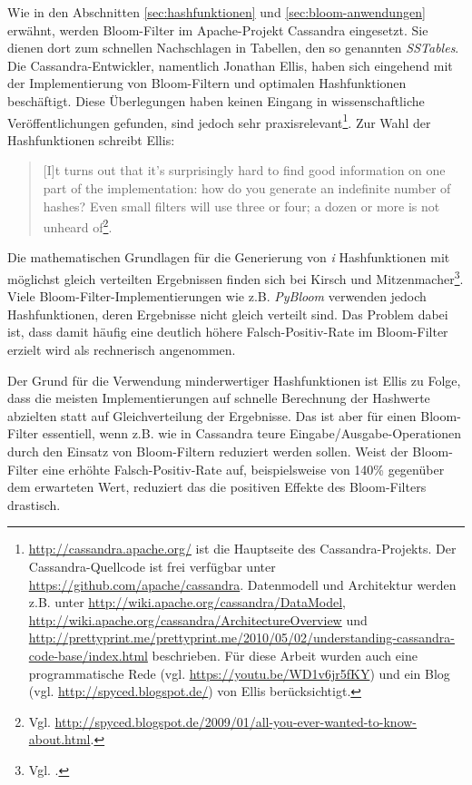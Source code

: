 Wie in den Abschnitten \ref{sec:hashfunktionen} und \ref{sec:bloom-anwendungen} erwähnt, werden Bloom-Filter im Apache-Projekt Cassandra eingesetzt. Sie dienen dort zum schnellen Nachschlagen in Tabellen, den so genannten \textit{SSTables}. Die Cassandra-Entwickler, namentlich Jonathan Ellis, haben sich eingehend mit der Implementierung von Bloom-Filtern und optimalen Hashfunktionen beschäftigt. Diese Überlegungen haben keinen Eingang in wissenschaftliche Veröffentlichungen gefunden, sind jedoch sehr praxisrelevant\footnote{\url{http://cassandra.apache.org/} ist die Hauptseite des Cassandra-Projekts. Der Cassandra-Quellcode ist frei verfügbar unter \url{https://github.com/apache/cassandra}. Datenmodell und Architektur werden z.B. unter \url{http://wiki.apache.org/cassandra/DataModel}, \url{http://wiki.apache.org/cassandra/ArchitectureOverview} und \url{http://prettyprint.me/prettyprint.me/2010/05/02/understanding-cassandra-code-base/index.html} beschrieben. Für diese Arbeit wurden auch eine programmatische Rede (vgl. \url{https://youtu.be/WD1v6jr5fKY}) und ein Blog (vgl. \url{http://spyced.blogspot.de/}) von Ellis berücksichtigt.}. Zur Wahl der Hashfunktionen schreibt Ellis: 
\begin{quote}
[I]t turns out that it's surprisingly hard to find good information on one part of the implementation: how do you generate an indefinite number of hashes? Even small filters will use three or four; a dozen or more is not unheard of\footnote{Vgl. \url{http://spyced.blogspot.de/2009/01/all-you-ever-wanted-to-know-about.html}.}. 
\end{quote}
Die mathematischen Grundlagen für die Generierung von \textit{i} Hashfunktionen mit möglichst gleich verteilten Ergebnissen finden sich bei Kirsch und Mitzenmacher\footnote{Vgl. \cite{Kirsch2006}.}. Viele Bloom-Filter-Implementierungen wie z.B. \textit{PyBloom} verwenden jedoch Hashfunktionen, deren Ergebnisse nicht gleich verteilt sind. Das Problem dabei ist, dass damit häufig eine deutlich höhere Falsch-Positiv-Rate im Bloom-Filter erzielt wird als rechnerisch angenommen. 

Der Grund für die Verwendung minderwertiger Hashfunktionen ist Ellis zu Folge, dass die meisten Implementierungen auf schnelle Berechnung der Hashwerte abzielten statt auf Gleichverteilung der Ergebnisse. Das ist aber für einen Bloom-Filter essentiell, wenn z.B. wie in Cassandra teure Eingabe/Ausgabe-Operationen durch den Einsatz von Bloom-Filtern reduziert werden sollen. Weist der Bloom-Filter eine erhöhte Falsch-Positiv-Rate auf, beispielsweise von 140\% gegenüber dem erwarteten Wert, reduziert das die positiven Effekte des Bloom-Filters drastisch.  

